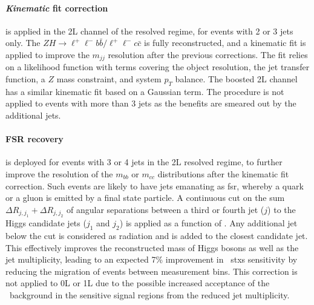 \paragraph{\textit{Kinematic} fit correction} is applied in the 2L channel of the resolved regime, for events with 2 or 3 jets only. The $ZH \rightarrow \ell^+\ell^- b\bar{b} / \ell^+\ell^- c\bar{c}$ is fully reconstructed, and a kinematic fit is applied to improve the $m_{jj}$ resolution after the previous corrections. The fit relies on a likelihood function with terms covering the object resolution, the jet transfer function, a $Z$ mass constraint, and system $p_T$ balance. The boosted 2L channel has a similar kinematic fit based on a Gaussian term. The procedure is not applied to events with more than 3 jets as the benefits are smeared out by the additional jets. %

\paragraph{FSR recovery} is deployed for events with 3 or 4 jets in the 2L resolved regime, to further improve the resolution of the $m_{bb}$ or $m_{cc}$ distributions after the kinematic fit correction. Such events are likely to have jets emanating as \gls{fsr}, whereby a quark or a gluon is emitted by a final state particle. A continuous cut on the sum $\Delta R_{j, j_1} + \Delta R_{j, j_2}$ of angular separations between a third or fourth jet ($j$) to the Higgs candidate jets ($j_1$ and $j_2$) is applied as a function of \ptv. Any additional jet below the cut is considered as radiation and is added to the closest candidate jet. This effectively improves the reconstructed mass of Higgs bosons as well as the jet multiplicity, leading to an expected 7\% improvement in \vhb\ \gls{stxs} sensitivity by reducing the migration of events between measurement bins. This correction is not applied to 0L or 1L due to the possible increased acceptance of the \ttb\ background in the sensitive signal regions from the reduced jet multiplicity.
